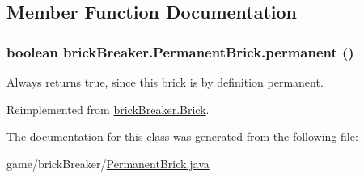 \subsection{Member Function Documentation}
\hypertarget{classbrick_breaker_1_1_permanent_brick_a5095518bc2226f3257202d99e37d8ae4}{
\subsubsection[{permanent}]{\setlength{\rightskip}{0pt plus 5cm}boolean brickBreaker.PermanentBrick.permanent ()}}
\label{classbrick_breaker_1_1_permanent_brick_a5095518bc2226f3257202d99e37d8ae4}
Always returns true, since this brick is by definition permanent. 

Reimplemented from \hyperlink{classbrick_breaker_1_1_brick_a5fa03da94163b3dc3707c030e85a1405}{brickBreaker.Brick}.



The documentation for this class was generated from the following file:\begin{DoxyCompactItemize}
\item 
game/brickBreaker/\hyperlink{_permanent_brick_8java}{PermanentBrick.java}\end{DoxyCompactItemize}
